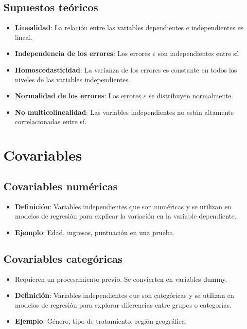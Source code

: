 \documentclass[
  letterpaper,
  DIV=11,
  numbers=noendperiod]{scrreprt}
\providecommand{\tightlist}{%
  \setlength{\itemsep}{0pt}\setlength{\parskip}{0pt}}\usepackage{longtable,booktabs,array}
\begin{document}
\subsection{Supuestos teóricos}\label{supuestos-teuxf3ricos-1}

\begin{itemize}
\tightlist
\item
  \textbf{Linealidad}: La relación entre las variables dependientes e
  independientes es lineal.
\item
  \textbf{Independencia de los errores}: Los errores \(\varepsilon\) son
  independientes entre sí.
\item
  \textbf{Homoscedasticidad}: La varianza de los errores es constante en
  todos los niveles de las variables independientes.
\item
  \textbf{Normalidad de los errores}: Los errores \(\varepsilon\) se
  distribuyen normalmente.
\item
  \textbf{No multicolinealidad}: Las variables independientes no están
  altamente correlacionadas entre sí.
\end{itemize}

\section{Covariables}\label{covariables}

\subsection{Covariables numéricas}\label{covariables-numuxe9ricas}

\begin{itemize}
\tightlist
\item
  \textbf{Definición}: Variables independientes que son numéricas y se
  utilizan en modelos de regresión para explicar la variación en la
  variable dependiente.
\item
  \textbf{Ejemplo}: Edad, ingresos, puntuación en una prueba.
\end{itemize}

\subsection{Covariables categóricas}\label{covariables-categuxf3ricas}

\begin{itemize}
\tightlist
\item
  Requieren un procesamiento previo. Se convierten en variables dummy.
\item
  \textbf{Definición}: Variables independientes que son categóricas y se
  utilizan en modelos de regresión para explorar diferencias entre
  grupos o categorías.
\item
  \textbf{Ejemplo}: Género, tipo de tratamiento, región geográfica.
\end{itemize}
\end{document}
